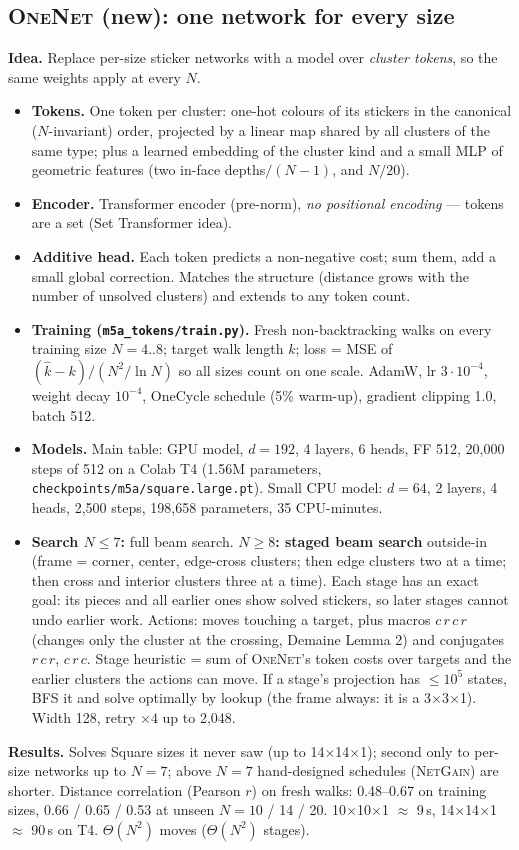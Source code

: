 \documentclass[10.5pt,a4paper]{article}
\newcommand{\Sq}[1]{#1$\times$#1$\times$1}
\newcommand{\M}[1]{\textsc{#1}}
\begin{document}
\subsection{\M{OneNet} (new): one network for every size}
\textbf{Idea.} Replace per-size sticker networks with a model over \emph{cluster tokens}, so the same weights apply at every $N$.
\begin{itemize}
\item \textbf{Tokens.} One token per cluster: one-hot colours of its stickers in the canonical ($N$-invariant) order, projected by
a linear map shared by all clusters of the same type; plus a learned embedding of the cluster kind and a small MLP of geometric
features (two in-face depths$/(N-1)$, and $N/20$).
\item \textbf{Encoder.} Transformer encoder (pre-norm), \emph{no positional encoding} --- tokens are a set (Set Transformer idea).
\item \textbf{Additive head.} Each token predicts a non-negative cost; sum them, add a small global correction. Matches the
structure (distance grows with the number of unsolved clusters) and extends to any token count.
\item \textbf{Training (\texttt{m5a\_tokens/train.py}).} Fresh non-backtracking walks on every training size $N=4..8$; target
walk length $k$; loss = MSE of $(\hat k-k)/(N^2/\ln N)$ so all sizes count on one scale. AdamW, lr $3\cdot10^{-4}$, weight decay
$10^{-4}$, OneCycle schedule (5\% warm-up), gradient clipping 1.0, batch 512.
\item \textbf{Models.} Main table: GPU model, $d=192$, 4 layers, 6 heads, FF 512, 20,000 steps of 512 on a Colab T4 (1.56M
parameters, \texttt{checkpoints/m5a/square.large.pt}). Small CPU model: $d=64$, 2 layers, 4 heads, 2,500 steps, 198,658 parameters,
35 CPU-minutes.
\item \textbf{Search $N\le7$:} full beam search. \textbf{$N\ge8$: staged beam search} outside-in (frame = corner, center, edge-cross
clusters; then edge clusters two at a time; then cross and interior clusters three at a time). Each stage has an exact goal: its
pieces and all earlier ones show solved stickers, so later stages cannot undo earlier work. Actions: moves touching a target, plus
macros $c\,r\,c\,r$ (changes only the cluster at the crossing, Demaine Lemma 2) and conjugates $r\,c\,r$, $c\,r\,c$. Stage heuristic
= sum of \M{OneNet}'s token costs over targets and the earlier clusters the actions can move. If a stage's projection has $\le10^5$
states, BFS it and solve optimally by lookup (the frame always: it is a \Sq{3}). Width 128, retry $\times4$ up to 2,048.
\end{itemize}
\textbf{Results.} Solves Square sizes it never saw (up to \Sq{14}); second only to per-size networks up to $N=7$; above $N=7$
hand-designed schedules (\M{NetGain}) are shorter. Distance correlation (Pearson $r$) on fresh walks: 0.48--0.67 on training sizes,
0.66 / 0.65 / 0.53 at unseen $N=10$ / 14 / 20. \Sq{10} $\approx$ 9\,s, \Sq{14} $\approx$ 90\,s on T4. $\Theta(N^2)$ moves
($\Theta(N^2)$ stages).
\end{document}
